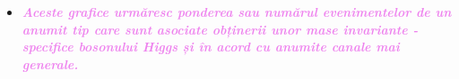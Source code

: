\documentclass{beamer}
\begin{document}
\begin{frame}{}

  \vspace{4cm}
\begin{itemize}
  \small
    \item[\ding{45}] \makebox[0.5cm]{} \textbf{\textit{ \textcolor{violet}{  Aceste grafice urmăresc ponderea sau numărul evenimentelor de un anumit tip care sunt asociate obținerii unor mase invariante - specifice bosonului Higgs și în acord cu anumite canale mai generale. }}}\\
 \end{itemize}
 
\end{frame}
\end{document}
